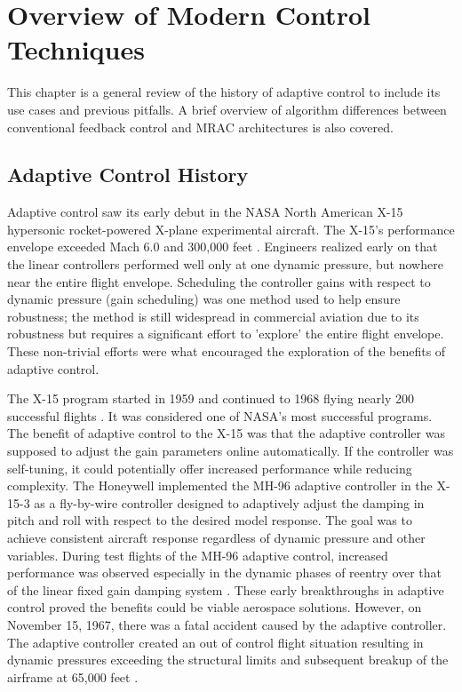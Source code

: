 \chapter{Overview of Modern Control Techniques}\label{ch:overview}
This chapter is a general review of the history of adaptive control to include its use cases and previous pitfalls.  A brief overview of algorithm differences between conventional feedback control and \ac{MRAC} architectures is also covered.
\section{Adaptive Control History}\label{history}
Adaptive control saw its early debut in the NASA North American X-15 hypersonic rocket-powered X-plane experimental aircraft.  The X-15's performance envelope exceeded Mach 6.0 and 300,000 feet \cite{jenkins2000x15specs}.  Engineers realized early on that the linear controllers performed well only at one dynamic pressure, but nowhere near the entire flight envelope.  Scheduling the controller gains with respect to dynamic pressure (gain scheduling) was one method used to help ensure robustness;  the method is still widespread in commercial aviation due to its robustness but requires a significant effort to 'explore' the entire flight envelope.  These non-trivial efforts were what encouraged the exploration of the benefits of adaptive control.

The X-15 program started in 1959 and continued to 1968 flying nearly 200 successful flights \cite{nasa_x15_facts}.  It was considered one of NASA's most successful programs.  The benefit of adaptive control to the X-15 was that the adaptive controller was supposed to adjust the gain parameters online automatically.  If the controller was self-tuning, it could potentially offer increased performance while reducing complexity.  The Honeywell implemented the MH-96 adaptive controller in the X-15-3 as a fly-by-wire controller designed to adaptively adjust the damping in pitch and roll with respect to the desired model response.  The goal was to achieve consistent aircraft response regardless of dynamic pressure and other variables.  During test flights of the MH-96 adaptive control, increased performance was observed especially in the dynamic phases of reentry over that of the linear fixed gain damping system \cite{dydek2010adaptive}.  These early breakthroughs in adaptive control proved the benefits could be viable aerospace solutions.  However, on November 15, 1967, there was a fatal accident caused by the adaptive controller.  The adaptive controller created an out of control flight situation resulting in dynamic pressures exceeding the structural limits and subsequent breakup of the airframe at 65,000 feet \cite{nasa_x15_facts}.

